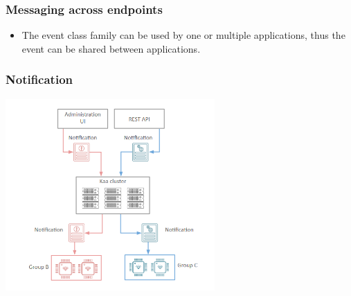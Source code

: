 \documentclass{beamer}
\begin{document}
\begin{frame}
	\frametitle{Messaging across endpoints}
	\begin{itemize}
		\item The event class family can be used by one or multiple applications,
			thus the \textcolor{TextOrange}{event can be shared between applications}.
	\end{itemize}
\end{frame}

\begin{frame}
	\frametitle{Notification}
	\centering\includegraphics[width=8cm]{figs/notification.png}
\end{frame}
\end{document}
